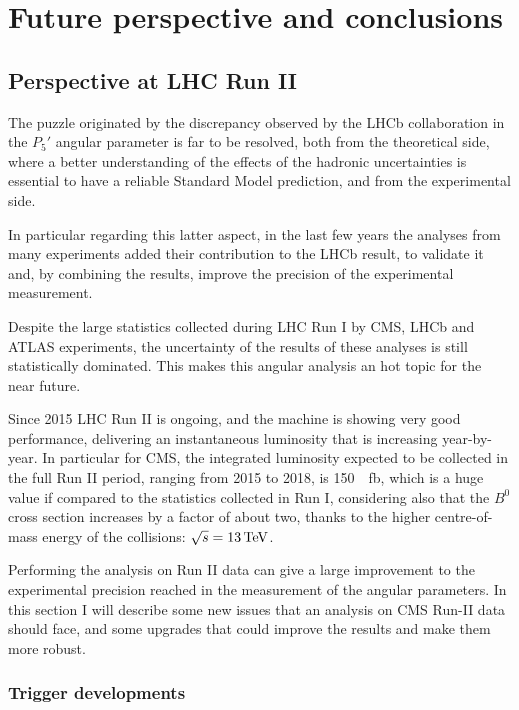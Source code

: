 \chapter{Future perspective and conclusions}
\label{sec:FutConcl}

\section{Perspective at LHC Run II}
\label{sec:Future}
The puzzle originated by the discrepancy observed by the LHCb collaboration in the $P_5'$ angular parameter is far to be resolved, both from the theoretical side, where a better understanding of the effects of the hadronic uncertainties is essential to have a reliable Standard Model prediction, and from the experimental side.

In particular regarding this latter aspect, in the last few years the analyses from many experiments added their contribution to the LHCb result, to validate it and, by combining the results, improve the precision of the experimental measurement.

Despite the large statistics collected during LHC Run I by CMS, LHCb and ATLAS experiments, the uncertainty of the results of these analyses is still statistically dominated.
This makes this angular analysis an hot topic for the near future.

Since 2015 LHC Run II is ongoing, and the machine is showing very good performance, delivering an instantaneous luminosity that is increasing year-by-year.
In particular for CMS, the integrated luminosity expected to be collected in the full Run II period, ranging from 2015 to 2018, is \SI{150}{\per\femto\barn}, which is a huge value if compared to the statistics collected in Run I, considering also that the $B^0$ cross section increases by a factor of about two, thanks to the higher centre-of-mass energy of the collisions: $\sqrt{s}=13\,\textrm{TeV}$.

Performing the analysis on Run II data can give a large improvement to the experimental precision reached in the measurement of the angular parameters.
In this section I will describe some new issues that an analysis on CMS Run-II data should face, and some upgrades that could improve the results and make them more robust.

\subsection{Trigger developments}
\label{sec:TrigDeve}

